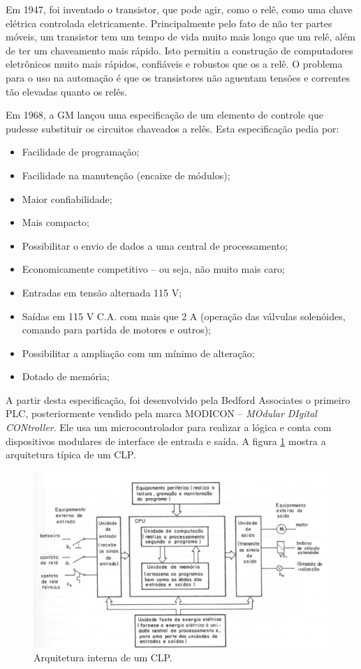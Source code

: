 Em 1947, foi inventado o transistor, que pode agir, como o relê, como uma chave elétrica controlada eletricamente. Principalmente pelo fato de não ter partes móveis, um transistor tem um tempo de vida muito mais longo que um relê, além de ter um chaveamento mais rápido. Isto permitiu a construção de computadores eletrônicos muito mais rápidos, confiáveis e robustos que os a relê. O problema para o uso na automação é que os transistores não aguentam tensões e correntes tão elevadas quanto os relês.

Em 1968, a GM lançou uma especificação de um elemento de controle que pudesse substituir os circuitos chaveados a relês. Esta especificação pedia por:
\begin{itemize}
  \item Facilidade de programação;
  \item Facilidade na manutenção (encaixe de módulos);
  \item Maior confiabilidade;
  \item Mais compacto;
  \item Possibilitar o envio de dados a uma central de processamento;
  \item Economicamente competitivo -- ou seja, não muito mais caro;
  \item Entradas em tensão alternada 115 V;
  \item Saídas  em 115 V C.A. com mais que 2 A (operação das válvulas solenóides, comando para partida de motores e outros);
  \item Possibilitar a ampliação com um mínimo de alteração;
  \item Dotado de memória;
\end{itemize}

A partir desta especificação, foi desenvolvido pela Bedford Associates o primeiro PLC, posteriormente vendido pela marca MODICON -- \emph{MOdular DIgital CONtroller}. Ele usa um microcontrolador para realizar a lógica e conta com dispositivos modulares de interface de entrada e saída. A figura \ref{fig:plc_sistema} mostra a arquitetura típica de um CLP.

\begin{figure}[hbt]
  \centering
  \includegraphics[width=\textwidth]{figuras/plc_sistema}
  \caption{Arquitetura interna de um CLP.}
  \label{fig:plc_sistema}
\end{figure}

